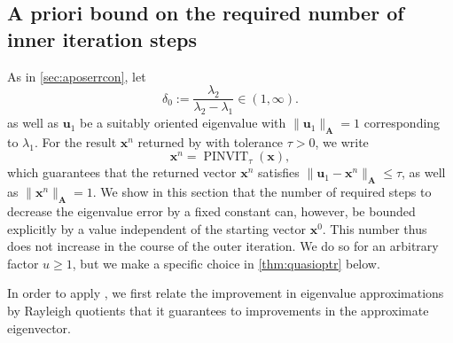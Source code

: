 \documentclass[a4paper,11pt,oneside]{amsart}
\providecommand{\norm}[1]{\lVert#1\rVert}
\theoremstyle{definition}
\theoremstyle{remark}
\newcommand{\A}{\ten A}
\newcommand{\ten}[1]{\boldsymbol{#1}}
\newcommand{\PINVIT}{\ensuremath{\operatorname{PINVIT}}}
\numberwithin{equation}{section}
\numberwithin{theorem}{section}
\begin{document}
\subsection{A priori bound on the required number of inner iteration steps}
As in \cref{sec:aposerrcon}, let
%
%
%
\begin{equation}\label{eq:defkappa}
%
 \delta_0 := \frac{\lambda_2}{\lambda_2 - \lambda_1} \in (1,\infty).
\end{equation}
as well as $\ten u_1$ be a suitably oriented eigenvalue with $\|\ten u_1\|_{\A} = 1$ corresponding to $\lambda_1$. For the result $\ten x^n$ returned by  with tolerance $\tau>0$, we write 
\[  \ten x^n =  \PINVIT_\tau(\ten x), \]
which guarantees that the returned vector $\ten x^n$ satisfies $\| \ten u_1 - \ten x^n \|_{\A} \leq \tau$, as well as $\norm{\ten x^n}_{\ten A}=1$.
We show in this section that the number of required steps to decrease the eigenvalue error by a fixed constant can, however, be bounded explicitly by a value independent of the starting vector $\ten x^0$. This number thus does not increase in the course of the outer iteration. We do so for an arbitrary factor $u \geq 1$, but we make a specific choice in \cref{thm:quasioptr} below.

In order to apply , we first relate the improvement in eigenvalue approximations by Rayleigh quotients that it guarantees to improvements in the approximate eigenvector.
\end{document}
